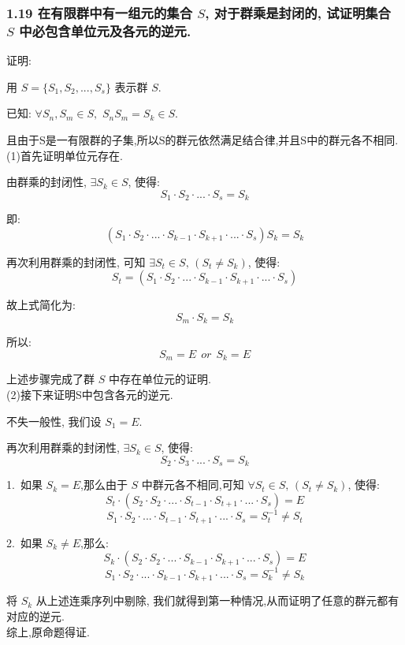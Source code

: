     \subsubsection{1.19 \textnormal{在有限群中有一组元的集合 $ S $, 对于群乘是封闭的, 试证明集合 $ S $ 中必包含单位元及各元的逆元}.}
    {\color{hwSolution}
    \noindent 证明:

        用 $S = \{S_1,S_2,...,S_s\}$ 表示群 $S$.

        已知: $\forall S_n,S_m\in S,\,\,S_n S_m = S_k\in S$.
    
        且由于S是一有限群的子集,所以S的群元依然满足结合律,并且S中的群元各不相同.\\

        (1)首先证明单位元存在.
        
        由群乘的封闭性, $\exists S_k \in S$, 使得:
        \[ S_1\cdot S_2\cdot...\cdot S_s = S_k \]

        即:
        \[ (S_1\cdot S_2\cdot...\cdot S_{k-1}\cdot S_{k+1}\cdot...\cdot S_s) S_k = S_k \]

        再次利用群乘的封闭性, 可知 $\exists S_t \in S,\, (S_t\neq S_k)$, 使得:
        \[S_t = (S_1\cdot S_2\cdot...\cdot S_{k-1}\cdot S_{k+1}\cdot...\cdot S_s)\]

        故上式简化为:
        \[ S_m\cdot S_k = S_k \]

        所以:
        \[ S_m = E~~or~~S_k = E \]

        上述步骤完成了群 $S$ 中存在单位元的证明.\\

        (2)接下来证明S中包含各元的逆元.
        
        不失一般性, 我们设 $S_1 = E$.
        
        再次利用群乘的封闭性, $\exists S_k \in S$, 使得:
        \[ S_2\cdot S_3\cdot...\cdot S_s = S_k \]

        1.~如果 $S_k = E$,那么由于 $S$ 中群元各不相同,可知 $\forall S_t \in S,\, (S_t\neq S_k)$, 使得:
        \[S_t\cdot(S_2\cdot S_2\cdot...\cdot S_{t-1}\cdot S_{t+1}\cdot...\cdot S_s) = E\]
        \[S_1\cdot S_2\cdot...\cdot S_{t-1}\cdot S_{t+1}\cdot...\cdot S_s= S_t^{-1} \neq S_t\]

        2.~如果 $S_k \neq E$,那么:
        \[S_k\cdot(S_2\cdot S_2\cdot...\cdot S_{k-1}\cdot S_{k+1}\cdot...\cdot S_s) = E\]
        \[S_1\cdot S_2\cdot...\cdot S_{k-1}\cdot S_{k+1}\cdot...\cdot S_s= S_k^{-1} \neq S_k\]

        将 $S_k$ 从上述连乘序列中剔除, 我们就得到第一种情况,从而证明了任意的群元都有对应的逆元.\\

        综上,原命题得证.
    }